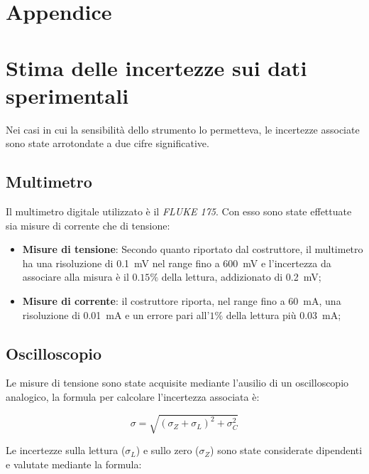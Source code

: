 \documentclass[@SRC@/main]{subfiles}
\begin{document}
    \section*{Appendice}
\vspace{0.2cm}
    \section{Stima delle incertezze sui dati sperimentali}
    \label{sec:stima-delle-incertezze-sui-dati-sperimentali}
    Nei casi in cui la sensibilità dello strumento lo permetteva, le incertezze associate sono
    state arrotondate a due cifre significative.
    \subsection*{Multimetro}
    Il multimetro digitale utilizzato è il \textit{FLUKE 175}.
    Con esso sono state effettuate sia misure di corrente che di tensione:
    \begin{itemize}
        \item \textbf{Misure di tensione}: Secondo quanto riportato dal costruttore, il multimetro
        ha una risoluzione di 0.1~mV nel range fino a 600~mV e l'incertezza da associare alla misura
        è il $0.15\%$ della lettura, addizionato di 0.2~mV;
        \item \textbf{Misure di corrente}: il costruttore riporta, nel range fino a
        60~mA, una risoluzione di 0.01~mA e un errore pari all'$1\%$ della
        lettura più 0.03~mA;
    \end{itemize}

    \subsection*{Oscilloscopio}
    \noindent Le misure di tensione sono state acquisite mediante l'ausilio di un oscilloscopio analogico,
    la formula per calcolare l'incertezza associata è:
    
        \begin{equation*}
            \sigma = \sqrt {\left( \sigma_Z + \sigma_L  \right)^2 + \sigma_C^2}
        \end{equation*}
    
\vspace{0.1cm}
    \noindent Le incertezze sulla lettura ($\sigma_L$) e sullo zero ($\sigma_Z$) sono state considerate dipendenti
    e valutate mediante la formula:
    \vspace{0.1cm}
\end{document}
